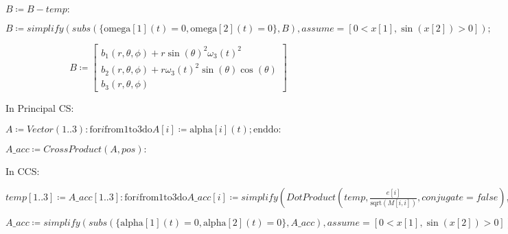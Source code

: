 \documentclass{article}
\begin{document}
\begin{Maple Normal}
{$ \displaystyle B \coloneqq B -\mathit{temp} \colon  $}
\end{Maple Normal}
\begin{Maple Normal}
{$ \displaystyle B \coloneqq \mathit{simplify} (\mathit{subs} ({\{\mathrm{omega}[1](t)=0,\mathrm{omega}[2](t)=0\}},B),\mathit{assume} =[0<x [1],\sin (x [2])>0]); $}
\end{Maple Normal}
\begin{dmath}\label{(10)}
B \coloneqq \left[\begin{array}{c}
b_{1}\! \left(r ,\theta ,\phi \right)+r \sin \! \left(\theta \right)^{2} \omega_{3}\! \left(t \right)^{2} 
\\
 b_{2}\! \left(r ,\theta ,\phi \right)+r \omega_{3}\! \left(t \right)^{2} \sin \! \left(\theta \right) \cos \! \left(\theta \right) 
\\
 b_{3}\! \left(r ,\theta ,\phi \right) 
\end{array}\right]
\end{dmath}
\begin{Maple Normal}
In Principal CS:
\end{Maple Normal}
\begin{Maple Normal}
{$ \displaystyle A \coloneqq \mathit{Vector} (1..3)\colon \boldsymbol{\mathrm{for}}i \boldsymbol{\mathrm{from}}1\boldsymbol{\mathrm{to}}3\boldsymbol{\mathrm{do}}A [i]\coloneqq \mathrm{alpha}[i](t);\boldsymbol{\mathrm{end}}\boldsymbol{\mathrm{do}}\colon  $}
\end{Maple Normal}
\begin{Maple Normal}
{$ \displaystyle \textit{A\_acc} \coloneqq \mathit{CrossProduct} (A ,\mathit{pos})\colon  $}
\end{Maple Normal}
\begin{Maple Normal}
In CCS:
\end{Maple Normal}
\begin{Maple Normal}
{$ \displaystyle \mathit{temp} [1..3]\coloneqq \textit{A\_acc} [1..3]\colon \boldsymbol{\mathrm{for}}i \boldsymbol{\mathrm{from}}1\boldsymbol{\mathrm{to}}3\boldsymbol{\mathrm{do}}\textit{A\_acc} [i]\coloneqq \mathit{simplify} (\mathit{DotProduct} (\mathit{temp} ,\frac{e [i]}{\mathrm{sqrt}(M [i ,i])},\mathit{conjugate} =\mathit{false}),\mathit{assume} =[0<x [1],\sin (x [2])>0])\boldsymbol{\mathrm{end}}\boldsymbol{\mathrm{do}}\colon  $}
\end{Maple Normal}
\begin{Maple Normal}
{$ \displaystyle \textit{A\_acc} \coloneqq \mathit{simplify} (\mathit{subs} ({\{\mathrm{alpha}[1](t)=0,\mathrm{alpha}[2](t)=0\}},\textit{A\_acc}),\mathit{assume} =[0<x [1],\sin (x [2])>0]); $}
\end{Maple Normal}
\end{document}

